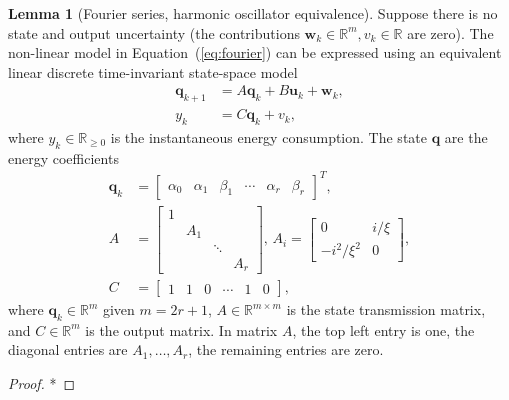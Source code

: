 \documentclass[letterpaper,10pt,conference]{ieeeconf}
\theoremstyle{definition}
\newtheorem{lem}[thm]{Lemma}
\begin{document}
\begin{lem}[Fourier series, harmonic oscillator equivalence]Suppose there is no state and output uncertainty (the contributions $\mathbf{w}_k\in\mathbb{R}^m,v_k\in\mathbb{R}$ are zero). The non-linear model in Equation~(\ref{eq:fourier}) can be expressed using an equivalent linear discrete time-invariant state-space model
\begin{equation}\label{eq:state-perf}\begin{split}
  \mathbf{q}_{k+1}&=A\mathbf{q}_{k}+B\mathbf{u}_{k}+\mathbf{w}_k,\\
  y_k&=C\mathbf{q}_k+v_k,
\end{split}\end{equation}
where $y_k\in\mathbb{R}_{\geq 0}$ is the instantaneous energy consumption. The state $\mathbf{q}$ are the energy coefficients
\begin{equation}\label{eq:state-details}\begin{split}
  \mathbf{q}_k&=\left[\begin{array}{cccccc}
    \alpha_0 & \alpha_1 & \beta_1 & \cdots & \alpha_r & \beta_r
  \end{array}\right]^T,\\
  A&=\left[\begin{array}{cccc}
    1&    &       &  \\
     & A_1&       &  \\
     &    & \ddots&  \\
     &    &       & A_r 
  \end{array}\right],\,A_i=\begin{bmatrix}0 & i/\xi \\ -i^2/\xi^2 & 0\end{bmatrix},\\
  C&=\left[\begin{array}{cccccc}
    1 & 1 & 0 & \cdots & 1 & 0
  \end{array}\right],
\end{split}\end{equation}
where $\mathbf{q}_k\in\mathbb{R}^m$ given $m=2r+1$, $A\in\mathbb{R}^{m\times m}$ is the state transmission matrix, and $C\in\mathbb{R}^m$ is the output matrix. In matrix $A$, the top left entry is one, the diagonal entries are $A_1,\dots,A_r$, the remaining entries are zero.
\end{lem}
\begin{proof}
  *
\end{proof}
\end{document}
